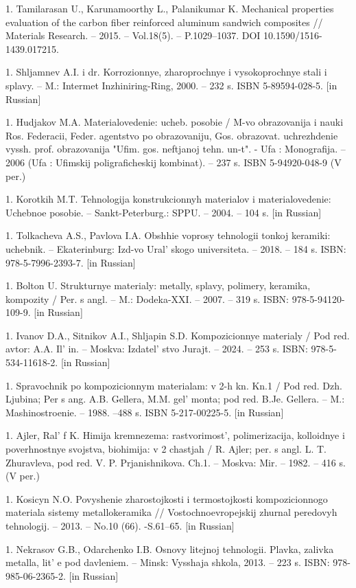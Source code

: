 1. Tamilarasan U., Karunamoorthy L., Palanikumar K. Mechanical properties
evaluation of the carbon fiber reinforced aluminum sandwich composites
// Materials Research. -- 2015. -- Vol.18(5). -- P.1029--1037. DOI
10.1590/1516-1439.017215.

1. Shljamnev A.I. i dr. Korrozionnye, zharoprochnye i vysokoprochnye
stali i splavy. -- M.: Intermet Inzhiniring-Ring, 2000. -- 232 s. ISBN
5-89594-028-5. {[}in Russian{]}

1. Hudjakov M.A. Materialovedenie: ucheb. posobie / M-vo obrazovanija i
nauki Ros. Federacii, Feder. agentstvo po obrazovaniju, Gos.
obrazovat. uchrezhdenie vyssh. prof. obrazovanija "Ufim. gos.
neftjanoj tehn. un-t". - Ufa : Monografija. -- 2006 (Ufa : Ufimskij
poligraficheskij kombinat). -- 237 s. ISBN 5-94920-048-9 (V per.)

1. Korotkih M.T. Tehnologija konstrukcionnyh materialov i
materialovedenie: Uchebnoe posobie. -- Sankt-Peterburg.: SPPU. --
2004. -- 104 s. {[}in Russian{]}

1. Tolkacheva A.S., Pavlova I.A. Obshhie voprosy tehnologii tonkoj
keramiki: uchebnik. -- Ekaterinburg: Izd-vo Ural' skogo
universiteta. -- 2018. -- 184 s. ISBN: 978-5-7996-2393-7. {[}in
Russian{]}

1. Bolton U. Strukturnye materialy: metally, splavy, polimery, keramika,
kompozity / Per. s angl. -- M.: Dodeka-XXI. -- 2007. -- 319 s. ISBN:
978-5-94120-109-9. {[}in Russian{]}

1. Ivanov D.A., Sitnikov A.I., Shljapin S.D. Kompozicionnye materialy /
Pod red. avtor: A.A. Il' in. -- Moskva:
Izdatel' stvo Jurajt. -- 2024. -- 253 s. ISBN:
978-5-534-11618-2. {[}in Russian{]}

1. Spravochnik po kompozicionnym materialam: v 2-h kn. Kn.1 / Pod red.
Dzh. Ljubina; Per s ang. A.B. Gellera, M.M. gel' monta;
pod red. B.Je. Gellera. -- M.: Mashinostroenie. -- 1988. --488 s. ISBN
5-217-00225-5. {[}in Russian{]}

1. Ajler, Ral' f K. Himija kremnezema:
rastvorimost', polimerizacija, kolloidnye i
poverhnostnye svojstva, biohimija: v 2 chastjah / R. Ajler; per. s
angl. L. T. Zhuravleva, pod red. V. P. Prjanishnikova. Ch.1. --
Moskva: Mir. -- 1982. -- 416 s. (V per.)

1. Kosicyn N.O. Povyshenie zharostojkosti i termostojkosti
kompozicionnogo materiala sistemy metallokeramika //
Vostochnoevropejskij zhurnal peredovyh tehnologij. -- 2013. -- No.10
(66). -S.61--65. {[}in Russian{]}

1. Nekrasov G.B., Odarchenko I.B. Osnovy litejnoj tehnologii. Plavka,
zalivka metalla, lit' e pod davleniem. -- Minsk:
Vysshaja shkola, 2013. -- 223 s. ISBN: 978-985-06-2365-2. {[}in
Russian{]}

